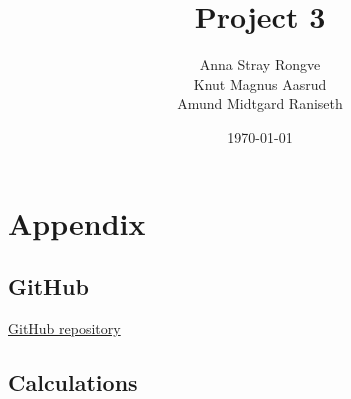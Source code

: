 \documentclass{article}
\title{Project 3}
\author{Anna Stray Rongve \\ Knut Magnus Aasrud \\ Amund Midtgard Raniseth}
\date{\today}
\begin{document}
\maketitle













\section{Appendix}
\subsection{GitHub}
\href{https://github.com/kmaasrud/Project-4}{GitHub repository}
\subsection{Calculations}
\end{document}

